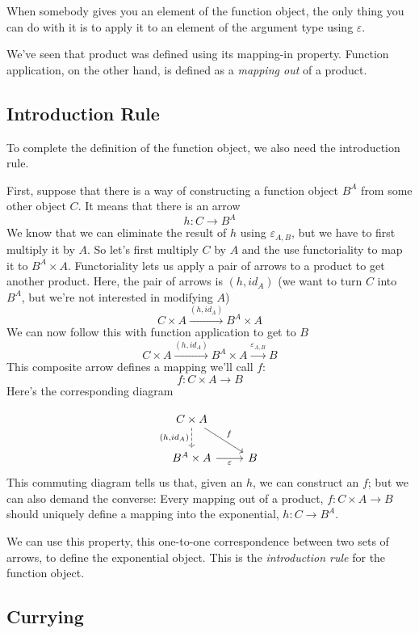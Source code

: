 \documentclass[DaoFP]{subfiles}
\begin{document}
When somebody gives you an element of the function object, the only thing you can do with it is to apply it to an element of the argument type using $\varepsilon$. 

We've seen that product was defined using its mapping-in property. Function application, on the other hand, is defined as a \emph{mapping out} of a product. 

\subsection{Introduction Rule}
To complete the definition of the function object, we also need the introduction rule. 

First, suppose that there is a way of constructing a function object $B^A$ from some other object $C$. It means that there is an arrow
\[h \colon C \to B^A\]
We know that we can eliminate the result of $h$ using $\varepsilon_{A, B}$, but we have to first multiply it by $A$. So let's first multiply $C$ by $A$ and the use functoriality to map it to $B^A \times A$. Functoriality lets us apply a pair of arrows to a product to get another product. Here, the pair of arrows is $(h, id_A)$ (we want to turn $C$ into $B^A$, but we're not interested in modifying $A$)
\[ C \times A \xrightarrow{(h, id_A)} B^A \times A \]
We can now follow this with function application to get to $B$
\[ C \times A \xrightarrow{(h, id_A)} B^A \times A \xrightarrow{\varepsilon_{A, B}} B\]
This composite arrow defines a mapping we'll call $f$:
\[f \colon C \times A \to B\]
Here's the corresponding diagram

\[
 \begin{tikzcd}
 C \times A
 \arrow[d, dashed, "{(h, id_A)}"']
 \arrow[rd, "f"]
 \\
 B^A \times A
 \arrow[r, "\varepsilon"']
& B
 \end{tikzcd}
\]
This commuting diagram tells us that, given an $h$, we can construct an $f$; but we can also demand the converse: Every mapping out of a product, $f \colon C \times A \to B$ should uniquely define a mapping into the exponential, $h \colon C \to B^A$. 

We can use this property, this one-to-one correspondence between two sets of arrows, to define the exponential object. This is the \emph{introduction rule} for the function object. 

\subsection{Currying}
\end{document}
